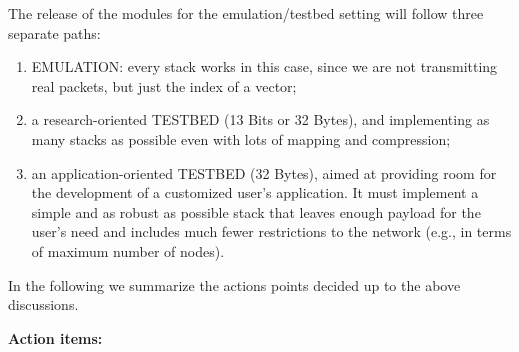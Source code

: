 \documentclass[11pt,journal,draftclsnofoot,onecolumn,twoside,letterpaper]{IEEEtran}
\theoremstyle{definition} \newtheorem{definition}[]{Definition}
\theoremstyle{theorem} \newtheorem{theorem}[]{Theorem}
\begin{document}
The release of the modules for the emulation/testbed setting will follow three separate paths:
\begin{enumerate}
 \item EMULATION: every stack works in this case, since we are not transmitting real packets, but just the index of a vector;
 \item a research-oriented TESTBED (13 Bits or 32 Bytes), and implementing as many stacks as possible even with lots of mapping and compression;
 \item an application-oriented TESTBED (32 Bytes), aimed at providing room for the development of a customized user's application. It must implement a simple and as robust as possible stack that leaves enough payload for the user's need and includes much fewer restrictions to the network (e.g., in terms of maximum number of nodes).  
\end{enumerate}

\newpage


In the following we summarize the actions points decided up to the above discussions.

{\bf Action items:}\\
\end{document}
